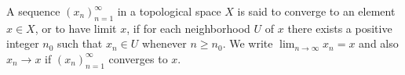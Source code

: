 A sequence $(x_n)_{n=1}^{\infty}$ in a topological space $X$ is said to converge to an element $x \in X$, or to have limit $x$, if for each neighborhood $U$ of $x$ there exists a positive integer $n_0$ such that $x_n \in U$ whenever $n \geq n_0$. We write $\lim_{n \to \infty} x_n = x$ and also $x_n \to x$ if $(x_n)_{n=1}^{\infty}$ converges to $x$.